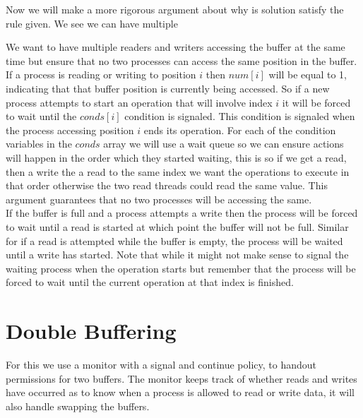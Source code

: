 \documentclass[a4paper, 12pt]{article}
\begin{document}
		Now we will make a more rigorous argument about why is solution satisfy the rule given. We see we can have multiple 
		
		We want to have multiple readers and writers accessing the buffer at the same time but ensure that no two processes can access the same position in the buffer. If a process is reading or writing to position $i$ then $num[i]$ will be equal to 1, indicating that that buffer position is currently being accessed. So if a new process attempts to start an operation that will involve index $i$ it will be forced to wait until the $conds[i]$ condition is signaled. This condition is signaled when the process accessing position $i$ ends its operation. For each of the condition variables in the $conds$ array we will use a wait queue so we can ensure actions will happen in the order which they started waiting, this is so if we get a read, then a write the a read to the same index we want the operations to execute in that order otherwise the two read threads could read the same value. This argument guarantees that no two processes will be accessing the same.\\
		
		If the buffer is full and a process attempts a write then the process will be forced to wait until a read is started at which point the buffer will not be full. Similar for if a read is attempted while the buffer is empty, the process will be waited until a write has started. Note that while it might not make sense to signal the waiting process when the operation starts but remember that the process will be forced to wait until the current operation at that index is finished.
			
	
	\section{Double Buffering}
		For this we use a monitor with a signal and continue policy, to handout permissions for two buffers. The monitor keeps track of whether reads and writes have occurred as to know when a process is allowed to read or write data, it will also handle swapping the buffers.
	
\end{document}
